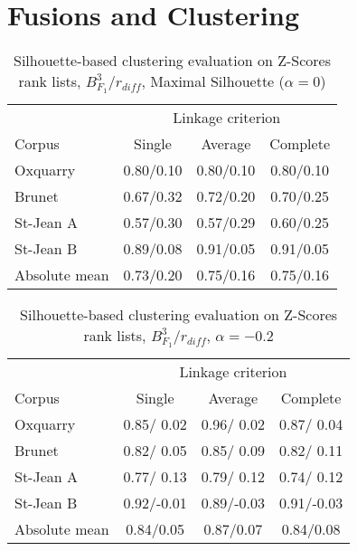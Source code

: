 \section{Fusions and Clustering}

\begin{table}[H]
  \centering
  \caption{Silhouette-based clustering evaluation on Z-Scores rank lists, $B^3_{F_1}$/$r_{diff}$, Maximal Silhouette ($\alpha = 0$)}
  \label{tab:silhouette-based_clustering_zscore}

  \begin{tabular}{l c c c}
    \toprule
           & \multicolumn{3}{c}{Linkage criterion} \\
    Corpus    & Single     & Average   & Complete \\
    \midrule
    Oxquarry  & 0.80/0.10 & 0.80/0.10 & 0.80/0.10 \\
    Brunet    & 0.67/0.32 & 0.72/0.20 & 0.70/0.25 \\
    St-Jean A & 0.57/0.30 & 0.57/0.29 & 0.60/0.25 \\
    St-Jean B & 0.89/0.08 & 0.91/0.05 & 0.91/0.05 \\
    \midrule
    Absolute mean & 0.73/0.20 & 0.75/0.16 & 0.75/0.16 \\
    \bottomrule
  \end{tabular}
\end{table}

\begin{table}[H]
  \centering
  \caption{Silhouette-based clustering evaluation on Z-Scores rank lists, $B^3_{F_1}$/$r_{diff}$, $\alpha = -0.2$}
  \label{tab:silhouette-based_clustering_zscore_alpha}

  \begin{tabular}{l c c c}
    \toprule
           & \multicolumn{3}{c}{Linkage criterion} \\
    Corpus    & Single     & Average   & Complete \\
    \midrule
    Oxquarry  & 0.85/ 0.02 & 0.96/ 0.02 & 0.87/ 0.04 \\
    Brunet    & 0.82/ 0.05 & 0.85/ 0.09 & 0.82/ 0.11 \\
    St-Jean A & 0.77/ 0.13 & 0.79/ 0.12 & 0.74/ 0.12 \\
    St-Jean B & 0.92/-0.01 & 0.89/-0.03 & 0.91/-0.03 \\
    \midrule
    Absolute mean & 0.84/0.05 & 0.87/0.07 & 0.84/0.08 \\
    \bottomrule
  \end{tabular}
\end{table}


